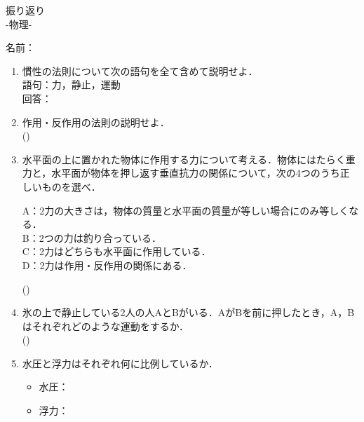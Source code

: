 \documentclass[fontsize=15pt]{jlreq}
\newcommand{\m}[1]{\raisebox{0.1em}{\textcircled{\scriptsize #1}}}
\begin{document}
\begin{center}
{\LARGE {振り返り}} \\
-物理\m{4}- %
\end{center}
\vspace{1em}
\begin{flushright}
名前：\underline{\hspace{5cm}}
\end{flushright}

\begin{enumerate}
    \item 慣性の法則について次の語句を全て含めて説明せよ．\\
    \small 語句：力，静止，運動 \\
    回答：
    \vspace{5em} 

    \item 作用・反作用の法則の説明せよ．\\
    (\hspace{15cm})
    \vspace{2em} 

    \item 水平面の上に置かれた物体に作用する力について考える．物体にはたらく重力と，水平面が物体を押し返す垂直抗力の関係について，次の4つのうち正しいものを選べ．
    \begin{itemize}
      \noindent  A：2力の大きさは，物体の質量と水平面の質量が等しい場合にのみ等しくなる．\\
        B：2つの力は釣り合っている．\\
        C：2力はどちらも水平面に作用している．\\
        D：2力は作用・反作用の関係にある．
    \end{itemize}
    (\hspace{2cm})
    \vspace{2em} 

    \item 氷の上で静止している2人の人AとBがいる．AがBを前に押したとき，A，Bはそれぞれどのような運動をするか．\\
    (\hspace{15cm})
    \vspace{2em}

    \item 水圧と浮力はそれぞれ何に比例しているか．
    \begin{itemize}
        \item 水圧：
        \item 浮力：
    \end{itemize}
    \vspace{2em}  

\end{enumerate}
\end{document}
